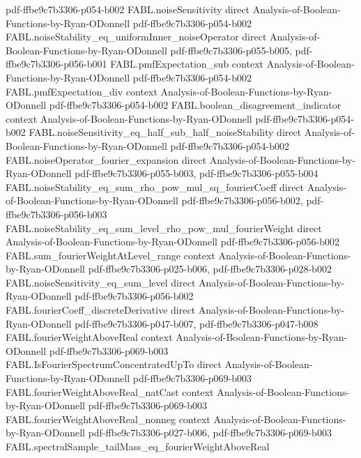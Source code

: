 \begin{theorem}
  {pdf-ffbe9c7b3306-p054-b002}
\proofstep
  {FABL.noiseSensitivity}
  {direct}
  {Analysis-of-Boolean-Functions-by-Ryan-ODonnell}
  {pdf-ffbe9c7b3306-p054-b002}
\proofstep
  {FABL.noiseStability_eq_uniformInner_noiseOperator}
  {direct}
  {Analysis-of-Boolean-Functions-by-Ryan-ODonnell}
  {pdf-ffbe9c7b3306-p055-b005,
    pdf-ffbe9c7b3306-p056-b001}
\proofstep
  {FABL.pmfExpectation_sub}
  {context}
  {Analysis-of-Boolean-Functions-by-Ryan-ODonnell}
  {pdf-ffbe9c7b3306-p054-b002}
\proofstep
  {FABL.pmfExpectation_div}
  {context}
  {Analysis-of-Boolean-Functions-by-Ryan-ODonnell}
  {pdf-ffbe9c7b3306-p054-b002}
\proofstep
  {FABL.boolean_disagreement_indicator}
  {context}
  {Analysis-of-Boolean-Functions-by-Ryan-ODonnell}
  {pdf-ffbe9c7b3306-p054-b002}
\proofstep
  {FABL.noiseSensitivity_eq_half_sub_half_noiseStability}
  {direct}
  {Analysis-of-Boolean-Functions-by-Ryan-ODonnell}
  {pdf-ffbe9c7b3306-p054-b002}
\proofstep
  {FABL.noiseOperator_fourier_expansion}
  {direct}
  {Analysis-of-Boolean-Functions-by-Ryan-ODonnell}
  {pdf-ffbe9c7b3306-p055-b003,
    pdf-ffbe9c7b3306-p055-b004}
\proofstep
  {FABL.noiseStability_eq_sum_rho_pow_mul_sq_fourierCoeff}
  {direct}
  {Analysis-of-Boolean-Functions-by-Ryan-ODonnell}
  {pdf-ffbe9c7b3306-p056-b002,
    pdf-ffbe9c7b3306-p056-b003}
\proofstep
  {FABL.noiseStability_eq_sum_level_rho_pow_mul_fourierWeight}
  {direct}
  {Analysis-of-Boolean-Functions-by-Ryan-ODonnell}
  {pdf-ffbe9c7b3306-p056-b002}
\proofstep
  {FABL.sum_fourierWeightAtLevel_range}
  {context}
  {Analysis-of-Boolean-Functions-by-Ryan-ODonnell}
  {pdf-ffbe9c7b3306-p025-b006,
    pdf-ffbe9c7b3306-p028-b002}
\proofstep
  {FABL.noiseSensitivity_eq_sum_level}
  {direct}
  {Analysis-of-Boolean-Functions-by-Ryan-ODonnell}
  {pdf-ffbe9c7b3306-p056-b002}
\proofstep
  {FABL.fourierCoeff_discreteDerivative}
  {direct}
  {Analysis-of-Boolean-Functions-by-Ryan-ODonnell}
  {pdf-ffbe9c7b3306-p047-b007,
    pdf-ffbe9c7b3306-p047-b008}
\proofstep
  {FABL.fourierWeightAboveReal}
  {context}
  {Analysis-of-Boolean-Functions-by-Ryan-ODonnell}
  {pdf-ffbe9c7b3306-p069-b003}
\proofstep
  {FABL.IsFourierSpectrumConcentratedUpTo}
  {direct}
  {Analysis-of-Boolean-Functions-by-Ryan-ODonnell}
  {pdf-ffbe9c7b3306-p069-b003}
\proofstep
  {FABL.fourierWeightAboveReal_natCast}
  {context}
  {Analysis-of-Boolean-Functions-by-Ryan-ODonnell}
  {pdf-ffbe9c7b3306-p069-b003}
\proofstep
  {FABL.fourierWeightAboveReal_nonneg}
  {context}
  {Analysis-of-Boolean-Functions-by-Ryan-ODonnell}
  {pdf-ffbe9c7b3306-p027-b006,
    pdf-ffbe9c7b3306-p069-b003}
\proofstep
  {FABL.spectralSample_tailMass_eq_fourierWeightAboveReal}

\end{theorem}
